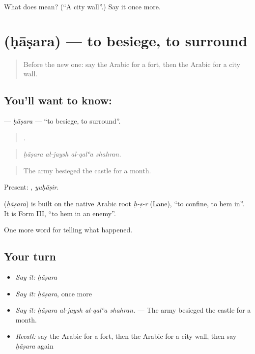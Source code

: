 \begin{tcolorbox}[breakable,colback=teal!4,colframe=teal!35!black,title={Before you move on}]
What does  mean? (\textquotedblleft{}A city wall\textquotedblright{}.) Say it once more.
\end{tcolorbox}
\section[\texorpdfstring{\ar{حاصر} (ḥāṣara)}{حاصر (ḥāṣara)}]{ (ḥāṣara) — to besiege, to surround}

\label{lesson:AR-C322-hasara}



\begin{quote}
Before the new one: say the Arabic for a fort, then the Arabic for a city wall.
\end{quote}

\subsection*{You'll want to know: }
\textbf{} — \emph{ḥāṣara} — \textquotedblleft{}to besiege, to surround\textquotedblright{}.

\begin{quote}
   .
\end{quote}

\begin{quote}
\emph{ḥāṣara al-jaysh al-qalʿa shahran.}
\end{quote}

\begin{quote}
The army besieged the castle for a month.
\end{quote}

Present: , \emph{yuḥāṣir}.

\begin{cousinweb}
\textbf{} (\emph{ḥāṣara}) is built on the native Arabic root \emph{ḥ-ṣ-r} (Lane), \textquotedblleft{}to confine, to hem in\textquotedblright{}. It is Form III, \textquotedblleft{}to hem in an enemy\textquotedblright{}.
\end{cousinweb}

\begin{grammarlens}[title={What you've built}]
One more word for telling what happened.
\end{grammarlens}

\subsection*{Your turn}
\begin{itemize}
\raggedright
  \item \emph{Say it:} \emph{ḥāṣara}
  \item \emph{Say it:} \emph{ḥāṣara}, once more
  \item \emph{Say it:} \emph{ḥāṣara al-jaysh al-qalʿa shahran.} — The army besieged the castle for a month.
  \item \emph{Recall:} say the Arabic for a fort, then the Arabic for a city wall, then say \emph{ḥāṣara} again
\end{itemize}

